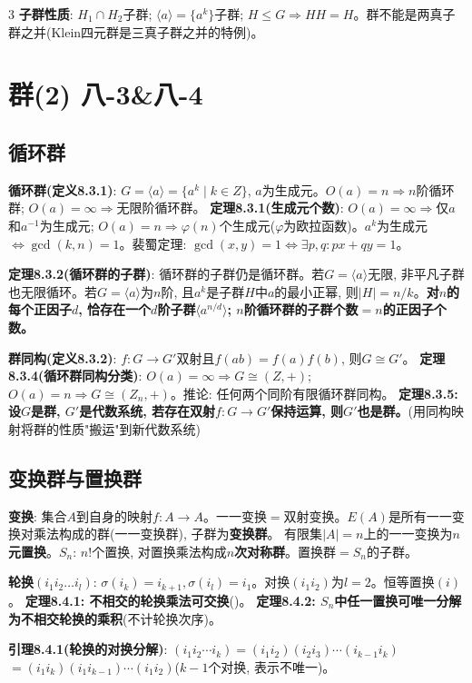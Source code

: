 \documentclass[4.5pt,landscape]{extarticle}
\newcommand{\rd}[1]{\textcolor{rd}{\textbf{#1}}}
\newcommand{\bu}[1]{\textcolor{bu}{\textbf{#1}}}
\newcommand{\xt}[1]{\textbf{#1}}
\begin{document}
\begin{multicols*}{3}
\xt{子群性质}: $H_1\cap H_2$子群; $\langle a\rangle=\{a^k\}$子群; $H\leq G\Rightarrow HH=H$。群不能是两真子群之并(Klein四元群是三真子群之并的特例)。

\section{群(2) 八-3\&八-4}
\subsection{循环群}
\xt{循环群(定义8.3.1)}: $G=\langle a\rangle=\{a^k\mid k\in Z\}$, $a$为生成元。$O(a)=n$$\Rightarrow n$阶循环群; $O(a)=\infty$$\Rightarrow$无限阶循环群。
\rd{定理8.3.1(生成元个数)}: $O(a)=\infty\Rightarrow$仅$a$和$a^{-1}$为生成元; $O(a)=n\Rightarrow\varphi(n)$个生成元($\varphi$为欧拉函数)。$a^k$为生成元$\Leftrightarrow\gcd(k,n)=1$。裴蜀定理: $\gcd(x,y)=1\Leftrightarrow\exists p,q:px+qy=1$。

\rd{定理8.3.2(循环群的子群)}: 循环群的子群仍是循环群。若$G=\langle a\rangle$无限, 非平凡子群也无限循环。若$G=\langle a\rangle$为$n$阶, 且$a^k$是子群$H$中$a$的最小正幂, 则$|H|=n/k$。\rd{对$n$的每个正因子$d$, 恰存在一个$d$阶子群$\langle a^{n/d}\rangle$; $n$阶循环群的子群个数$=n$的正因子个数。}


\xt{群同构(定义8.3.2)}: $f:G\to G'$双射且$f(ab)=f(a)f(b)$, 则$G\cong G'$。
\rd{定理8.3.4(循环群同构分类)}: $O(a)=\infty\Rightarrow G\cong(Z,+)$; $O(a)=n\Rightarrow G\cong(Z_n,+)$。推论: 任何两个同阶有限循环群同构。
\rd{定理8.3.5: 设$G$是群, $G'$是代数系统, 若存在双射$f:G\to G'$保持运算, 则$G'$也是群。}(用同构映射将群的性质"搬运"到新代数系统)

\subsection{变换群与置换群}
\xt{变换}: 集合$A$到自身的映射$f:A\to A$。一一变换$=$双射变换。$E(A)$是所有一一变换对乘法构成的群(一一变换群), 子群为\xt{变换群}。
有限集$|A|=n$上的一一变换为\xt{$n$元置换}。$S_n$: $n!$个置换, 对置换乘法构成\xt{$n$次对称群}。置换群$=S_n$的子群。

\xt{轮换$(i_1i_2\ldots i_l)$}: $\sigma(i_k)=i_{k+1},\sigma(i_l)=i_1$。对换$(i_1i_2)$为$l=2$。恒等置换$(i)$。
\bu{定理8.4.1: 不相交的轮换乘法可交换}()。
\rd{定理8.4.2: $S_n$中任一置换可唯一分解为不相交轮换的乘积}(不计轮换次序)。

\bu{引理8.4.1(轮换的对换分解)}: $(i_1i_2\cdots i_k)=(i_1i_2)(i_2i_3)\cdots(i_{k-1}i_k)$ $=(i_1i_k)(i_1i_{k-1})\cdots(i_1i_2)$($k-1$个对换, 表示不唯一)。


\end{multicols*}
\end{document}
